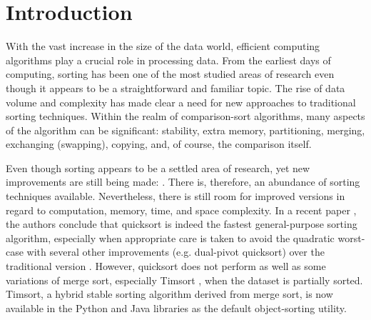 \documentclass[acmtog]{acmart}
\begin{document}



\maketitle


\section{Introduction}
With the vast increase in the size of the data world, efficient computing algorithms play a crucial role in processing data.
From the earliest days of computing, sorting has been one of the most studied areas of research even though it appears to be a straightforward and familiar topic.
The rise of data volume and complexity has made clear a need for new approaches to traditional sorting techniques.
Within the realm of comparison-sort algorithms, many aspects of the algorithm can be significant: stability, extra memory, partitioning, merging, exchanging (swapping), copying, and, of course, the comparison itself.

Even though sorting appears to be a settled area of research, yet new improvements are still being made: \cite{Dual-pivot,Timsort,doi:10.1137/1.9781611975994.101,10.5555/313559.313859}.
There is, therefore, an abundance of sorting techniques available.
Nevertheless, there is still room for improved versions in regard to computation, memory, time, and space complexity.
In a recent paper \cite{sort}, the authors conclude that quicksort is indeed the fastest general-purpose sorting algorithm, especially when appropriate care is taken to avoid the quadratic worst-case with several other improvements (e.g. dual-pivot quicksort)\cite{Dual-pivot} over the traditional version \cite{10.1145/366622.366644}.
However, quicksort does not perform as well as some variations of merge sort, especially Timsort \cite{Timsort}, when the dataset is partially sorted.
Timsort, a hybrid stable sorting algorithm derived from merge sort, is now available in the Python and Java libraries as the default object-sorting utility.
\end{document}

